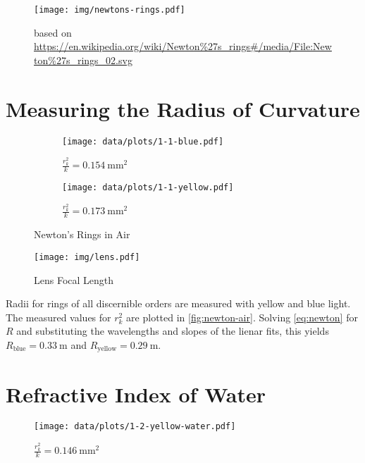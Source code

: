 \begin{figure}[tbp]
	\centering
	\texttt{[image: img/newtons-rings.pdf]}
	\caption{Newton's Rings}
	\label{fig:newton}
	\caption*{based on \url{https://en.wikipedia.org/wiki/Newton\%27s_rings\#/media/File:Newton\%27s_rings_02.svg}}
\end{figure}

\section{Measuring the Radius of Curvature}\label{sec:radius}

\begin{figure}[tbp]
	\centering
	\begin{subfigure}{.49\textwidth}
		\centering
		\texttt{[image: data/plots/1-1-blue.pdf]}
		\caption{Blue LED (\SI{465}{\nm})}
		\caption*{$\frac{r_k^2}{k} = \SI{0.154}{\mm\squared}$}
	\end{subfigure}
	\begin{subfigure}{.49\textwidth}
		\centering
		\texttt{[image: data/plots/1-1-yellow.pdf]}
		\caption{Yellow LED (\SI{590}{\nm})}
		\caption*{$\frac{r_k^2}{k} = \SI{0.173}{\mm\squared}$}
	\end{subfigure}
	\caption{Newton's Rings in Air}
	\label{fig:newton-air}
\end{figure}

\begin{figure}[tbp]
	\centering
	\texttt{[image: img/lens.pdf]}
	\caption{Lens Focal Length}
	\label{fig:lens}
\end{figure}

Radii for rings of all discernible orders are measured with yellow and blue light.
The measured values for $r_k^2$ are plotted in \autoref{fig:newton-air}.
Solving \autoref{eq:newton} for $R$ and substituting the wavelengths and slopes of the lienar fits, this yields $R_\text{blue} = \SI{0.33}{\meter}$ and $R_\text{yellow} = \SI{0.29}{\meter}$.

\section{Refractive Index of Water}

\begin{figure}[tbp]
	\centering
	\texttt{[image: data/plots/1-2-yellow-water.pdf]}
	\caption{Newton's Rings Yellow LED (\SI{590}{\nm}) in Water}
	\caption*{$\frac{r_k^2}{k} = \SI{0.146}{\mm\squared}$}
\end{figure}

